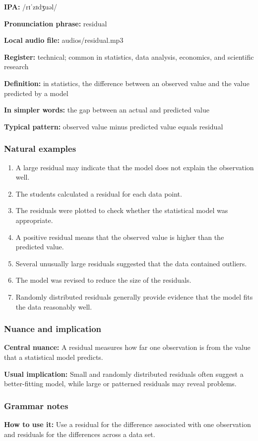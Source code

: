 \documentclass[11pt]{article}
\begin{document}
\textbf{IPA:} /rɪˈzɪdʒuəl/

\textbf{Pronunciation phrase:} residual

\textbf{Local audio file:} audios/residual.mp3

\textbf{Register:} technical; common in statistics, data analysis, economics, and scientific research

\textbf{Definition:} in statistics, the difference between an observed value and the value predicted by a model

\textbf{In simpler words:} the gap between an actual and predicted value

\textbf{Typical pattern:} observed value minus predicted value equals residual

\subsubsection{Natural examples}
\begin{enumerate}
  \item A large residual may indicate that the model does not explain the observation well.
  \item The students calculated a residual for each data point.
  \item The residuals were plotted to check whether the statistical model was appropriate.
  \item A positive residual means that the observed value is higher than the predicted value.
  \item Several unusually large residuals suggested that the data contained outliers.
  \item The model was revised to reduce the size of the residuals.
  \item Randomly distributed residuals generally provide evidence that the model fits the data reasonably well.
\end{enumerate}

\subsubsection{Nuance and implication}
\textbf{Central nuance:} A residual measures how far one observation is from the value that a statistical model predicts.

\textbf{Usual implication:} Small and randomly distributed residuals often suggest a better-fitting model, while large or patterned residuals may reveal problems.

\subsubsection{Grammar notes}
\textbf{How to use it:} Use a residual for the difference associated with one observation and residuals for the differences across a data set.
\end{document}
